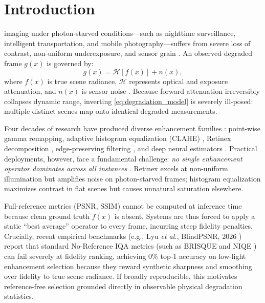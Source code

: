 \documentclass[journal]{IEEEtran}
\begin{document}
\section{Introduction}
 imaging under photon-starved conditions—such as nighttime surveillance, intelligent transportation, and mobile photography—suffers from severe loss of contrast, non-uniform underexposure, and sensor grain \cite{zheng2024lowlight, wei2018deep}. An observed degraded frame $g(x)$ is governed by:
\begin{equation}
g(x) = \mathcal{H}[f(x)] + n(x),
\label{eq:degradation_model}
\end{equation}
where $f(x)$ is true scene radiance, $\mathcal{H}$ represents optical and exposure attenuation, and $n(x)$ is sensor noise \cite{chen2018learning}. Because forward attenuation irreversibly collapses dynamic range, inverting \eqref{eq:degradation_model} is severely ill-posed: multiple distinct scenes map onto identical degraded measurements.

Four decades of research have produced diverse enhancement families \cite{zheng2024lowlight}: point-wise gamma remapping, adaptive histogram equalization (CLAHE) \cite{zuiderveld1994contrast}, Retinex decomposition \cite{land1971lightness, jobson1997multiscale}, edge-preserving filtering \cite{tomasi1998bilateral}, and deep neural estimators \cite{wei2018deep, guo2020zero}. Practical deployments, however, face a fundamental challenge: \textit{no single enhancement operator dominates across all instances} \cite{wolpert1997no}. Retinex excels at non-uniform illumination but amplifies noise on photon-starved frames; histogram equalization maximizes contrast in flat scenes but causes unnatural saturation elsewhere. 

Full-reference metrics (PSNR, SSIM) \cite{wang2004image, hore2010image} cannot be computed at inference time because clean ground truth $f(x)$ is absent. Systems are thus forced to apply a static ``best average'' operator to every frame, incurring steep fidelity penalties. Crucially, recent empirical benchmarks (e.g., Lyu \textit{et al.}, BlindPSNR, 2026 \cite{lyu2026blindpsnr}) report that standard No-Reference IQA metrics (such as BRISQUE \cite{mittal2012no} and NIQE \cite{mittal2013making}) can fail severely at fidelity ranking, achieving 0\% top-1 accuracy on low-light enhancement selection because they reward synthetic sharpness and smoothing over fidelity to true scene radiance. If broadly reproducible, this motivates reference-free selection grounded directly in observable physical degradation statistics.
\end{document}
